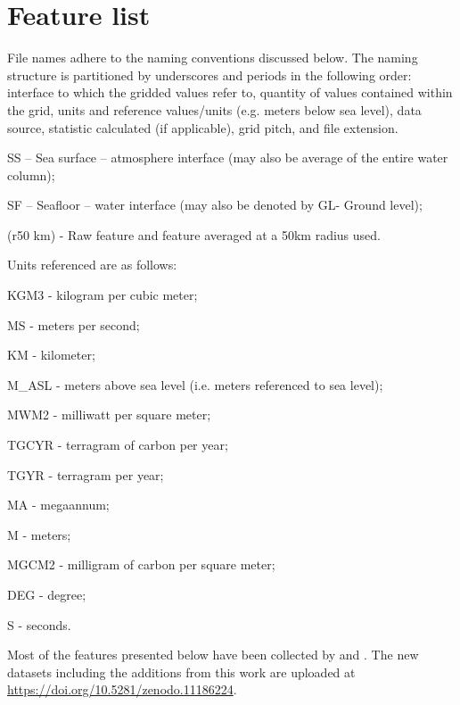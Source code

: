 \documentclass[journal abbreviation, manuscript]{copernicus}
\begin{document}
\section{Feature list}
\label{appendix:featurelist}

File names adhere to the naming conventions discussed below. The naming structure is partitioned by underscores and periods in the following order: interface to which the gridded values refer to, quantity of values contained within the grid, units and reference values/units (e.g. meters below sea level), data source, statistic calculated (if applicable), grid pitch, and file extension.


SS – Sea surface – atmosphere interface (may also be average of the entire water column);

SF – Seafloor – water interface (may also be denoted by GL- Ground level);

 (r50 km) - Raw feature and feature averaged at a 50km radius used.

Units referenced are as follows:

KGM3 - kilogram per cubic meter;

MS - meters per second;

KM - kilometer;

M\_ASL - meters above sea level (i.e. meters referenced to sea level);

MWM2 - milliwatt per square meter;

TGCYR - terragram of carbon per year;

TGYR - terragram per year;

MA - megaannum;

M - meters;

MGCM2 - milligram of carbon per square meter;

DEG - degree;

S - seconds.

Most of the features presented below have been collected by  \cite{lee_2020_3675364} and \cite{benjamin_j_phrampus_2019_3459805}. The new datasets including the additions from this work are uploaded at \url{https://doi.org/10.5281/zenodo.11186224}.
\end{document}
